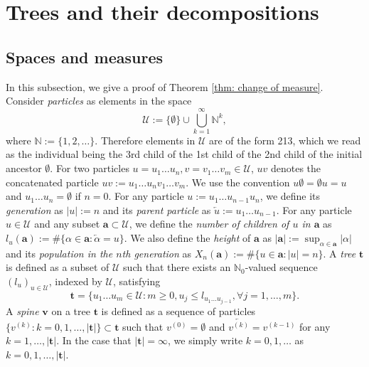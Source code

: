 \documentclass[12pt,a4paper]{amsart}
\numberwithin{equation}{section}
\begin{document}
	
\section{Trees and their decompositions}
\label{sec:preliminary}
\subsection{Spaces and measures}
\label{sec:spacesandmeasures}
	In this subsection, we give a proof of Theorem \ref{thm: change of measure}.
 	Consider \emph{particles} as elements in the space
\begin{equation*}
		\mathcal U
	:=
	\{\emptyset\}\cup\bigcup_{k=1}^\infty \mathbb N^k,
\end{equation*}
	where $\mathbb N:=\{1,2,\dots\}$.
	Therefore elements in $\mathcal U$ are of the form 213, which we read as the individual being the 3rd child of the 1st child of the 2nd child of the initial ancestor $\emptyset$.
	For two particles $u=u_1\dots u_n, v=v_1\dots v_m\in\mathcal U$, $uv$ denotes the concatenated particle $uv:=u_1\dots u_nv_1\dots v_m$.
	We use the convention $u\emptyset = \emptyset u = u$ and $u_1\dots u_n=\emptyset$ if $n=0$.
	For any particle $u:=u_1\dots u_{n-1}u_n$, we define its \emph{generation} as $| u |:=n$ and its \emph{parent particle} as $\overleftarrow{u}:=u_1\dots u_{n-1}$.
	For any particle $u \in \mathcal U$ and any subset $\mathbf a \subset \mathcal U$, we define the \emph{number of children of $u$ in $\mathbf a$} as $l_u(\mathbf a) := \#\{\alpha\in \mathbf a:\overleftarrow{\alpha}=u\} $.
	We also define the \emph{height} of $\mathbf a$ as $|\mathbf a|:=\sup_{\alpha\in \mathbf a}|\alpha|$ and its \emph{population in the $n$th generation} as $X_n(\mathbf a):=\#\{u\in \mathbf a:|u|=n\}$.
	A \emph{tree} $ \mathbf t $ is defined as a subset of $\mathcal U$ such that there exists an $\mathbb N_0$-valued sequence $(l_u)_{u\in \mathcal U}$,
	indexed by $\mathcal U$, satisfying
\begin{equation*}
		 \mathbf t
	=\{u_1\dots u_m\in \mathcal U: m\ge 0, u_j\leq l_{u_1\dots u_{j-1}}, \forall  j=1,\dots,m\}.
\end{equation*}
	A \emph{spine} $ \mathbf v$ on a  tree $ \mathbf t $ is defined as a sequence of particles $\{v^{(k)}:k=0,1,\dots,| \mathbf t |\}\subset \mathbf t $ such that $v^{(0)}=\emptyset$ and $\overleftarrow{v^{(k)}}=v^{(k-1)}$ for any $k=1,\dots, | \mathbf t |$.
	In the case that $| \mathbf t |=\infty$, we simply write $k=0,1,\dots$ as $k=0,1,\dots, | \mathbf t |$.
\end{document}
